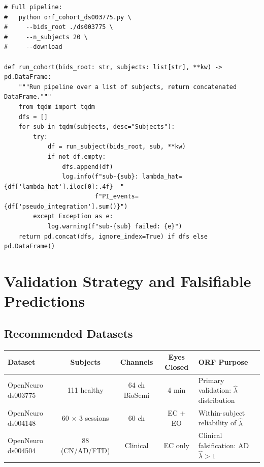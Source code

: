 \documentclass[12pt,a4paper]{article}
\theoremstyle{plain}
\theoremstyle{definition}
\newcommand{\hatlambda}{\hat{\lambda}}
\begin{document}
\begin{lstlisting}[style=orfpython, caption={One-command cohort runner for ds003775 (\texttt{orf\_cohort\_ds003775.py})}]
# Full pipeline:
#   python orf_cohort_ds003775.py \
#     --bids_root ./ds003775 \
#     --n_subjects 20 \
#     --download

def run_cohort(bids_root: str, subjects: list[str], **kw) -> pd.DataFrame:
    """Run pipeline over a list of subjects, return concatenated DataFrame."""
    from tqdm import tqdm
    dfs = []
    for sub in tqdm(subjects, desc="Subjects"):
        try:
            df = run_subject(bids_root, sub, **kw)
            if not df.empty:
                dfs.append(df)
                log.info(f"sub-{sub}: lambda_hat={df['lambda_hat'].iloc[0]:.4f}  "
                         f"PI_events={df['pseudo_integration'].sum()}")
        except Exception as e:
            log.warning(f"sub-{sub} failed: {e}")
    return pd.concat(dfs, ignore_index=True) if dfs else pd.DataFrame()
\end{lstlisting}

\section{Validation Strategy and Falsifiable Predictions}
\label{sec:validation}

\subsection{Recommended Datasets}
\label{sec:validation:datasets}

\begin{center}
\renewcommand{\arraystretch}{1.3}
\begin{tabular}{@{}p{3cm}cccp{4.5cm}@{}}
  \toprule
  \textbf{Dataset} & \textbf{Subjects} & \textbf{Channels} & \textbf{Eyes Closed} & \textbf{ORF Purpose} \\
  \midrule
  OpenNeuro ds003775 & 111 healthy & 64 ch BioSemi & 4 min & Primary validation: $\hatlambda$ distribution \\
  OpenNeuro ds004148 & 60 $\times$ 3 sessions & 60 ch & EC + EO & Within-subject reliability of $\hatlambda$ \\
  OpenNeuro ds004504 & 88 (CN/AD/FTD) & Clinical & EC only & Clinical falsification: AD $\hatlambda > 1$ \\
  \bottomrule
\end{tabular}
\end{center}
\end{document}
